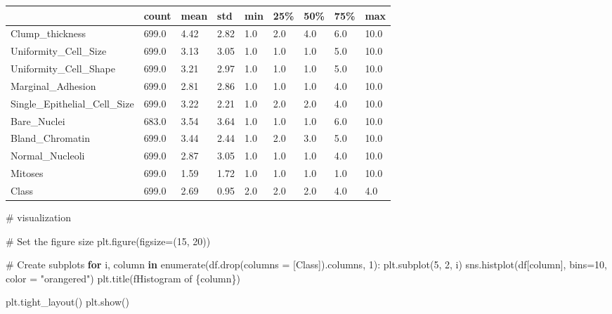 \documentclass[
  letterpaper,
  DIV=11,
  numbers=noendperiod]{scrreprt}
\newenvironment{Shaded}{\begin{snugshade}}{\end{snugshade}}
\newcommand{\BuiltInTok}[1]{\textcolor[rgb]{0.00,0.23,0.31}{#1}}
\newcommand{\CommentTok}[1]{\textcolor[rgb]{0.37,0.37,0.37}{#1}}
\newcommand{\ControlFlowTok}[1]{\textcolor[rgb]{0.00,0.23,0.31}{\textbf{#1}}}
\newcommand{\DecValTok}[1]{\textcolor[rgb]{0.68,0.00,0.00}{#1}}
\newcommand{\KeywordTok}[1]{\textcolor[rgb]{0.00,0.23,0.31}{\textbf{#1}}}
\newcommand{\NormalTok}[1]{\textcolor[rgb]{0.00,0.23,0.31}{#1}}
\newcommand{\OperatorTok}[1]{\textcolor[rgb]{0.37,0.37,0.37}{#1}}
\newcommand{\SpecialCharTok}[1]{\textcolor[rgb]{0.37,0.37,0.37}{#1}}
\newcommand{\SpecialStringTok}[1]{\textcolor[rgb]{0.13,0.47,0.30}{#1}}
\newcommand{\StringTok}[1]{\textcolor[rgb]{0.13,0.47,0.30}{#1}}
\newcounter{none} %
\begin{document}
{\def\LTcaptype{none} %
\begin{longtable}[]{@{}lllllllll@{}}
\toprule\noalign{}
& count & mean & std & min & 25\% & 50\% & 75\% & max \\
\midrule\noalign{}
\endhead
\bottomrule\noalign{}
\endlastfoot
Clump\_thickness & 699.0 & 4.42 & 2.82 & 1.0 & 2.0 & 4.0 & 6.0 & 10.0 \\
Uniformity\_Cell\_Size & 699.0 & 3.13 & 3.05 & 1.0 & 1.0 & 1.0 & 5.0 &
10.0 \\
Uniformity\_Cell\_Shape & 699.0 & 3.21 & 2.97 & 1.0 & 1.0 & 1.0 & 5.0 &
10.0 \\
Marginal\_Adhesion & 699.0 & 2.81 & 2.86 & 1.0 & 1.0 & 1.0 & 4.0 &
10.0 \\
Single\_Epithelial\_Cell\_Size & 699.0 & 3.22 & 2.21 & 1.0 & 2.0 & 2.0 &
4.0 & 10.0 \\
Bare\_Nuclei & 683.0 & 3.54 & 3.64 & 1.0 & 1.0 & 1.0 & 6.0 & 10.0 \\
Bland\_Chromatin & 699.0 & 3.44 & 2.44 & 1.0 & 2.0 & 3.0 & 5.0 & 10.0 \\
Normal\_Nucleoli & 699.0 & 2.87 & 3.05 & 1.0 & 1.0 & 1.0 & 4.0 & 10.0 \\
Mitoses & 699.0 & 1.59 & 1.72 & 1.0 & 1.0 & 1.0 & 1.0 & 10.0 \\
Class & 699.0 & 2.69 & 0.95 & 2.0 & 2.0 & 2.0 & 4.0 & 4.0 \\
\end{longtable}
}

\begin{Shaded}
\begin{Highlighting}[]
\CommentTok{\# visualization }

\CommentTok{\# Set the figure size}
\NormalTok{plt.figure(figsize}\OperatorTok{=}\NormalTok{(}\DecValTok{15}\NormalTok{, }\DecValTok{20}\NormalTok{))}

\CommentTok{\# Create subplots}
\ControlFlowTok{for}\NormalTok{ i, column }\KeywordTok{in} \BuiltInTok{enumerate}\NormalTok{(df.drop(columns }\OperatorTok{=}\NormalTok{ [}\StringTok{\textquotesingle{}Class\textquotesingle{}}\NormalTok{]).columns, }\DecValTok{1}\NormalTok{):}
\NormalTok{    plt.subplot(}\DecValTok{5}\NormalTok{, }\DecValTok{2}\NormalTok{, i)}
\NormalTok{    sns.histplot(df[column], bins}\OperatorTok{=}\DecValTok{10}\NormalTok{, color }\OperatorTok{=} \StringTok{"orangered"}\NormalTok{)}
\NormalTok{    plt.title(}\SpecialStringTok{f\textquotesingle{}Histogram of }\SpecialCharTok{\{}\NormalTok{column}\SpecialCharTok{\}}\SpecialStringTok{\textquotesingle{}}\NormalTok{)}

\NormalTok{plt.tight\_layout()}
\NormalTok{plt.show()}
\end{Highlighting}
\end{Shaded}
\end{document}
